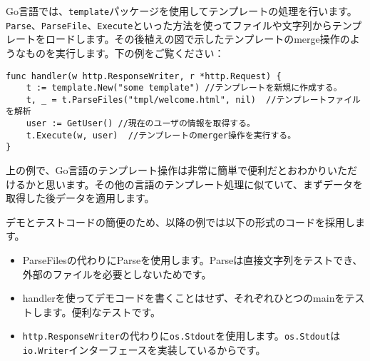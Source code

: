 Go言語では、\texttt{template}パッケージを使用してテンプレートの処理を行います。\texttt{Parse}、\texttt{ParseFile}、\texttt{Execute}といった方法を使ってファイルや文字列からテンプレートをロードします。その後植えの図で示したテンプレートのmerge操作のようなものを実行します。下の例をご覧ください：

\begin{lstlisting}[numbers=none]
func handler(w http.ResponseWriter, r *http.Request) {
    t := template.New("some template") //テンプレートを新規に作成する。
    t, _ = t.ParseFiles("tmpl/welcome.html", nil)  //テンプレートファイルを解析
    user := GetUser() //現在のユーザの情報を取得する。
    t.Execute(w, user)  //テンプレートのmerger操作を実行する。
}
\end{lstlisting}

上の例で、Go言語のテンプレート操作は非常に簡単で便利だとおわかりいただけるかと思います。その他の言語のテンプレート処理に似ていて、まずデータを取得した後データを適用します。

デモとテストコードの簡便のため、以降の例では以下の形式のコードを採用します。

\begin{itemize}
  \item ParseFilesの代わりにParseを使用します。Parseは直接文字列をテストでき、外部のファイルを必要としないためです。
  \item handlerを使ってデモコードを書くことはせず、それぞれひとつのmainをテストします。便利なテストです。
  \item \texttt{http.ResponseWriter}の代わりに\texttt{os.Stdout}を使用します。\texttt{os.Stdout}は\texttt{io.Writer}インターフェースを実装しているからです。
\end{itemize}

